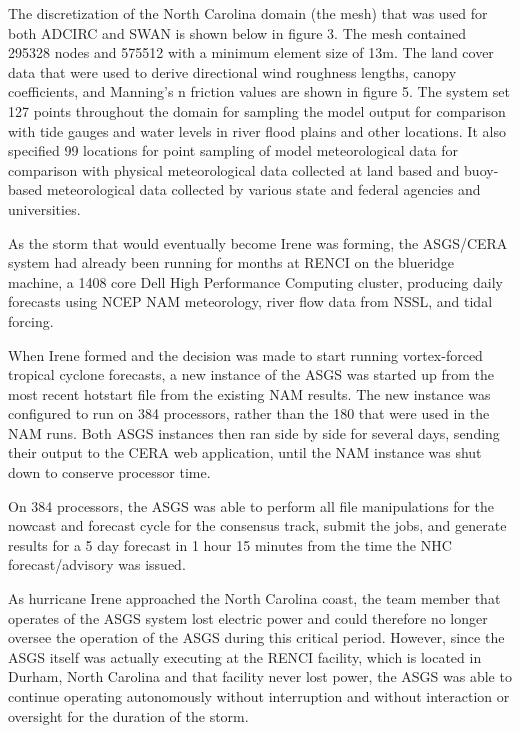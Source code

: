 \documentclass[jmse,article,submit,moreauthors,pdftex,12pt,a4paper]{mdpi}
\begin{document}

The discretization of the North Carolina domain (the mesh) that was 
used for both ADCIRC and SWAN is shown below in figure 3. The mesh 
contained 295328 nodes and 575512 with a minimum element size of 
13m. The land cover data that were used to derive directional wind 
roughness lengths, canopy coefficients, and Manning's n friction 
values are shown in figure 5. The system set 127 points throughout 
the domain for sampling the model output for comparison with tide 
gauges and water levels in river flood plains and other locations. 
It also specified 99 locations for point sampling of model 
meteorological data for comparison with physical meteorological data 
collected at land based and buoy-based meteorological data collected 
by various state and federal agencies and universities.


As the storm that would eventually become Irene was forming, the 
ASGS/CERA system had already been running for months at RENCI on the 
blueridge machine, a 1408 core Dell High Performance Computing 
cluster, producing daily forecasts using NCEP NAM meteorology, river 
flow data from NSSL, and tidal forcing. 

When Irene formed and the decision was made to start running 
vortex-forced tropical cyclone forecasts, a new instance of the ASGS 
was started up from the most recent hotstart file from the existing 
NAM results. The new instance was configured to run on 384 
processors, rather than the 180 that were used in the NAM runs. Both 
ASGS instances then ran side by side for several days, sending their 
output to the CERA web application, until the NAM instance was shut 
down to conserve processor time.


On 384 processors, the ASGS was able to perform all file 
manipulations for the nowcast and forecast cycle for the consensus 
track, submit the jobs, and generate results for a 5 day forecast in 
1 hour 15 minutes from the time the NHC forecast/advisory was issued. 

As hurricane Irene approached the North Carolina coast, the team 
member that operates of the ASGS system lost electric power and 
could therefore no longer oversee the operation of the ASGS during 
this critical period. However, since the ASGS itself was actually 
executing at the RENCI facility, which is located in Durham, North 
Carolina and that facility never lost power, the ASGS was able to 
continue operating autonomously without interruption and without 
interaction or oversight for the duration of the storm.  
\end{document}

